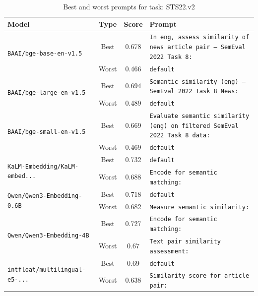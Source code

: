 \begin{table}[t]
\centering
\small
\caption{Best and worst prompts for task: STS22.v2}
\begin{tabular}{|p{}|c|c|p{}|}
\hline
Model & Type & Score & Prompt \\
\hline
\multirow{2}{=}{\raggedright\texttt{BAAI/\allowbreak bge-\allowbreak base-\allowbreak en-\allowbreak v1.5}} & Best & 0.678 & \texttt{In eng, assess similarity of news article pair – SemEval 2022 Task 8:} \\
\cline{2-4}
& Worst & 0.466 & \texttt{default} \\
\hline
\multirow{2}{=}{\raggedright\texttt{BAAI/\allowbreak bge-\allowbreak large-\allowbreak en-\allowbreak v1.5}} & Best & 0.694 & \texttt{Semantic similarity (eng) – SemEval 2022 Task 8 News:} \\
\cline{2-4}
& Worst & 0.489 & \texttt{default} \\
\hline
\multirow{2}{=}{\raggedright\texttt{BAAI/\allowbreak bge-\allowbreak small-\allowbreak en-\allowbreak v1.5}} & Best & 0.669 & \texttt{Evaluate semantic similarity (eng) on filtered SemEval 2022 Task 8 data:} \\
\cline{2-4}
& Worst & 0.469 & \texttt{default} \\
\hline
\multirow{2}{=}{\raggedright\texttt{KaLM-\allowbreak Embedding/\allowbreak KaLM-\allowbreak embed...}} & Best & 0.732 & \texttt{default} \\
\cline{2-4}
& Worst & 0.688 & \texttt{Encode for semantic matching:} \\
\hline
\multirow{2}{=}{\raggedright\texttt{Qwen/\allowbreak Qwen3-\allowbreak Embedding-\allowbreak 0.6B}} & Best & 0.718 & \texttt{default} \\
\cline{2-4}
& Worst & 0.682 & \texttt{Measure semantic similarity:} \\
\hline
\multirow{2}{=}{\raggedright\texttt{Qwen/\allowbreak Qwen3-\allowbreak Embedding-\allowbreak 4B}} & Best & 0.727 & \texttt{Encode for semantic matching:} \\
\cline{2-4}
& Worst & 0.67 & \texttt{Text pair similarity assessment:} \\
\hline
\multirow{2}{=}{\raggedright\texttt{intfloat/\allowbreak multilingual-\allowbreak e5-\allowbreak ...}} & Best & 0.69 & \texttt{default} \\
\cline{2-4}
& Worst & 0.638 & \texttt{Similarity score for article pair:} \\
\hline
\end{tabular}
\end{table}

